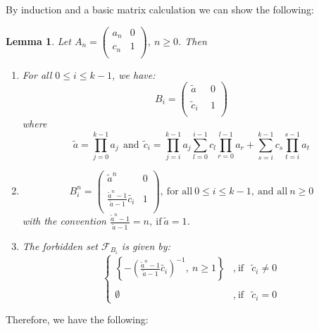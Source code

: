 \documentclass[11pt]{amsart}
\newtheorem{lem}[thm]{Lemma}
\theoremstyle{definition}
\theoremstyle{remark}
\theoremstyle{example}
\numberwithin{equation}{section}
\begin{document}
By induction and a basic matrix calculation we can show the following:
\medskip
\begin{lem}\rm{ Let $ A_{n}
=\left(\begin{array}{cc}
a_n & 0 \\
c_n & 1 \\
\end{array}\right), \ n\geq0$. Then
\noindent
\begin{enumerate}[leftmargin=*]
\item For all $0\leq i\leq k-1$, we have:
$$B_i=\left(\begin{array}{cc}
\tilde{a}& \ \ 0 \\
\\
\tilde{c}_i & \ \ 1 \\
\end{array}\right)$$
 where
 $$\tilde{a}=\prod\limits_{j=0}^{k-1} a_j \ \ \text{and} \ \ \tilde{c}_i=\prod\limits_{j=i}^{k-1} a_j\sum\limits_{l=0}^{i-1}c_l\prod_{r=0}^{l-1} a_r+\sum\limits_{s=i}^{k-1}c_s\prod\limits_{t=i}^{s-1} a_t$$
\item $$ B_i^n=\left(\begin{array}{cc}
           \tilde{a}^n & 0 \\
\\
            \displaystyle{\frac{\tilde{a}^n-1}{\tilde{a}-1}\tilde{c_i}} & 1 \\
 \end{array} \right), \ \text{for all} \ 0\leq i\leq k-1, \ \text{and all} \ n\geq0$$
\vspace{1mm}
with the convention $\displaystyle{\frac{\tilde{a}^n-1}{\tilde{a}-1}}=n, \ \text{if} \ \tilde{a}=1$.
\vspace{1mm}
\item The forbidden set $\mathcal{F}_{B_i}$ is given by:
$$\left\{\begin{array}{ccc}
      \left\{-\left(\displaystyle{\frac{\tilde{a}^n-1}{\tilde{a}-1}}\tilde{c_i}\right)^{-1}, \ n\geq1\right\}&, \ \text{if}&\tilde{c}_i\neq0 \\
      \\
      \emptyset &, \ \text{if}&\tilde{c}_i=0
    \end{array}\right.$$
\end{enumerate}
}\end{lem}
\medskip
\noindent
Therefore, we have the following:
\medskip
\end{document}
